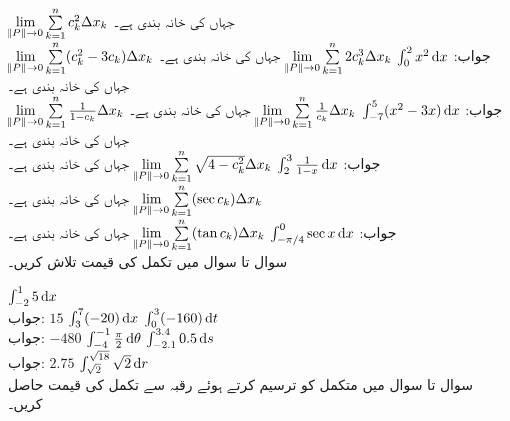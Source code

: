 $\lim\limits_{\norm{P}\to 0}\sum\limits_{k=1}^nc_k^2\Delta x_k$
جہاں  کی خانہ بندی  ہے۔\\
جواب:\quad
$\int_0^2x^2\dif x$
$\lim\limits_{\norm{P}\to 0}\sum\limits_{k=1}^n 2c_k^3\Delta x_k$
جہاں  کی خانہ بندی  ہے۔
$\lim\limits_{\norm{P}\to 0}\sum\limits_{k=1}^n (c_k^2-3c_k)\Delta x_k$
جہاں  کی خانہ بندی  ہے۔\\
جواب:\quad
$\int_{-7}^5(x^2-3x)\dif x$
$\lim\limits_{\norm{P}\to 0}\sum\limits_{k=1}^n \tfrac{1}{c_k}\Delta x_k$
جہاں  کی خانہ بندی  ہے۔
$\lim\limits_{\norm{P}\to 0}\sum\limits_{k=1}^n \tfrac{1}{1-c_k}\Delta x_k$
جہاں  کی خانہ بندی  ہے۔\\
جواب:\quad
$\int_2^3\tfrac{1}{1-x}\dif x$
$\lim\limits_{\norm{P}\to 0}\sum\limits_{k=1}^n \sqrt{4-c_k^2}\Delta x_k$
جہاں  کی خانہ بندی  ہے۔
$\lim\limits_{\norm{P}\to 0}\sum\limits_{k=1}^n (\sec c_k)\Delta x_k$
جہاں  کی خانہ بندی  ہے۔\\
جواب:\quad
$\int_{-\pi/4}^0\sec x\dif x$
$\lim\limits_{\norm{P}\to 0}\sum\limits_{k=1}^n (\tan c_k)\Delta x_k$
جہاں  کی خانہ بندی  ہے۔
\\
سوال  تا سوال  میں تکمل کی قیمت تلاش کریں۔

$\int_{-2}^{1}5\dif x$\\
جواب:\quad
$15$
$\int_{3}^{7}(-20)\dif x$
$\int_{0}^{3}(-160)\dif t$\\
جواب:\quad
$-480$
$\int_{-4}^{-1}\tfrac{\pi}{2}\dif\theta$
$\int_{-2.1}^{3.4}0.5\dif s$\\
جواب:\quad
$2.75$
$\int_{\sqrt{2}}^{\sqrt{18}}\sqrt{2}\dif r$
\\
سوال  تا سوال  میں متکمل کو ترسیم کرتے ہوئے رقبہ سے تکمل کی قیمت حاصل کریں۔

